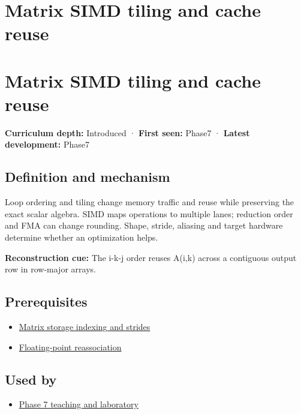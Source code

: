 \hypertarget{appendix-1bfb7c657105}{}
\section*{Matrix SIMD tiling and cache reuse}
\section{Matrix SIMD tiling and cache reuse}\label{appendix-1bfb7c657105-matrix-simd-tiling-and-cache-reuse}

\textbf{Curriculum depth:} Introduced · \textbf{First seen:} Phase7 · \textbf{Latest development:} Phase7

\subsection{Definition and mechanism}\label{appendix-1bfb7c657105-definition-and-mechanism}

Loop ordering and tiling change memory traffic and reuse while preserving the exact scalar algebra. SIMD maps operations to multiple lanes; reduction order and FMA can change rounding. Shape, stride, aliasing and target hardware determine whether an optimization helps.

\textbf{Reconstruction cue:} The i-k-j order reuses A(i,k) across a contiguous output row in row-major arrays.

\subsection{Prerequisites}\label{appendix-1bfb7c657105-prerequisites}

\begin{itemize}
\tightlist
\item
  \hyperref[appendix-ffdc1d4e5350]{Matrix storage indexing and strides}
\item
  \hyperref[appendix-c2ac4a84c283]{Floating-point reassociation}
\end{itemize}

\subsection{Used by}\label{appendix-1bfb7c657105-used-by}

\begin{itemize}
\tightlist
\item
  \hyperref[01-foundations-i-ch018-keep-the-promises-visible-while-moving-between-representations]{Phase 7 teaching and laboratory}
\end{itemize}

